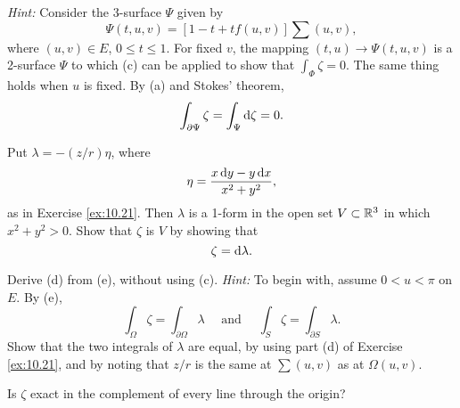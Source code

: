 \begin{myexercise}
\begin{asparaenum}[(a)]
        \emph{Hint:} Consider the 3-surface $\Psi$ given by
        \begin{equation*}
            \Psi(t,u,v) = \left[ 1-t+t f(u,v) \right] \sum (u,v) ,
        \end{equation*}
        where $(u, v) \in E$, $0 \leq t \leq 1$. 
        For fixed $v$, the mapping $(t, u) \rightarrow \Psi(t, u, v)$ is a 2-surface $\Psi$ to which (c) can be applied to show that $\int_{\Phi} \zeta = 0$. 
        The same thing holds when $u$ is fixed. 
        By (a) and Stokes' theorem,
        \begin{equation*}
            \int_{\partial \Psi} \zeta = 
            \int_{\Psi} \d \zeta = 0.
        \end{equation*}
        \item Put $\lambda = -(z/r)\eta$, where 
        \begin{equation*}
            \eta = \frac{x \d y - y \d x}{x^2+y^2} ,
        \end{equation*}
        as in Exercise \ref{ex:10.21}.
        Then $\lambda$ is a 1-form in the open set $V \subset {\protect\mathbb R}^3$ in which $x^2 + y^2 > 0$.
        Show that $\zeta$ is  $V$ by showing that
        \begin{equation*}
            \zeta = \d \lambda .
        \end{equation*}
        \item Derive (d) from (e), without using (c).
        \emph{Hint:} To begin with, assume $0 < u < \pi$ on $E$. 
        By (e), 
        \begin{equation*}
            \int_{\Omega} \zeta = \int_{\partial \Omega} \lambda 
            \quad \text{ and } \quad 
            \int_{S} \zeta = \int_{\partial S} \lambda .
        \end{equation*} 
        Show that the two integrals of $\lambda$ are equal, by using part (d) of Exercise \ref{ex:10.21}, 
        and by noting that $z/r$ is the same at $\sum(u, v)$ as at $\Omega(u, v)$.
        \item Is $\zeta$ exact in the complement of every line through the origin?
    \end{asparaenum}
\end{myexercise}


